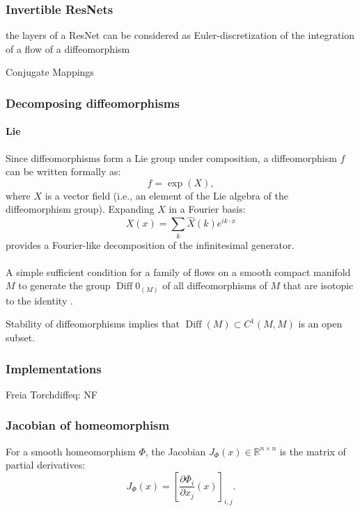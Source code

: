 \documentclass{article}
\theoremstyle{definition} \newtheorem{definition}{Definition}  \newtheorem{example}{Example}
\theoremstyle{remark} \newtheorem{remark}{Remark}
\newcommand{\Diff}{\operatorname{Diff}}
\newcounter{ct}
\begin{document}
\subsubsection{Invertible ResNets}
the layers of a ResNet can be considered as Euler-discretization of the integration of a flow of a diffeomorphism\citep{rousseau2020residual}







Conjugate Mappings \citep{bramburger2021conjugate}


\subsubsection{Decomposing diffeomorphisms}\label{sec:diff_dec}
\paragraph{Lie}
Since diffeomorphisms form a Lie group under composition, a diffeomorphism 
\( f \) can be written formally as:
\[
f = \exp(X),
\]
where \( X \) is a vector field (i.e., an element of the Lie algebra of the diffeomorphism group). Expanding \( X \) in a Fourier basis:
\[
X(x) = \sum_k \hat{X}(k) e^{i k \cdot x}
\]
provides a Fourier-like decomposition of the infinitesimal generator.

\paragraph{}
A simple sufficient condition for a family of flows on a smooth compact manifold $M$ to generate the group $\Diff0_(M)$ of all diffeomorphisms of $M$ that are isotopic to the identity \citep{caponigro2010families}.

Stability of diffeomorphisms implies that $\Diff(M)\subset C^1(M,M)$  is an open subset.


\subsubsection{Implementations}
Freia\citep{freia} %
Torchdiffeq: \citep{torchdiffeq}
NF\citep{dinh2016density} %
\citep{stimper2023normflows} %



\subsubsection{Jacobian of homeomorphism}
 For a smooth homeomorphism \( \Phi \), the Jacobian \( J_{\Phi}(x) \in \mathbb{R}^{n \times n} \) is the matrix of partial derivatives:
\[
J_{\Phi}(x) = \left[ \frac{\partial \Phi_i}{\partial x_j}(x) \right]_{i,j}.
\]
\end{document}
